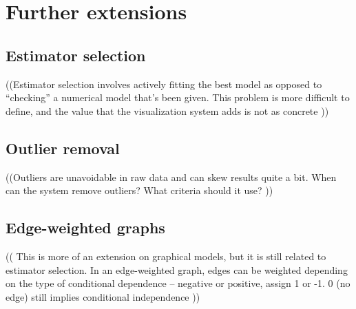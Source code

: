 \section{Further extensions}

\subsection{Estimator selection}

((Estimator selection involves actively fitting the best model as opposed to ``checking'' a numerical model that’s been given. This problem is more difficult to define, and the value that the visualization system adds is not as concrete ))

\subsection{Outlier removal}

((Outliers are unavoidable in raw data and can skew results quite a bit. When can the system remove outliers? What criteria should it use? ))

\subsection{Edge-weighted graphs}

(( This is more of an extension on graphical models, but it is still related to estimator selection. In an edge-weighted graph, edges can be weighted depending on the type of conditional dependence – negative or positive, assign 1 or -1. 0 (no edge) still implies conditional independence ))